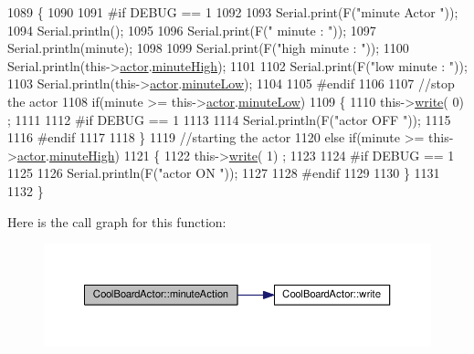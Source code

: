 \begin{DoxyCode}
1089 \{
1090 
1091 \textcolor{preprocessor}{#if DEBUG == 1}
1092     
1093     Serial.print(F(\textcolor{stringliteral}{"minute Actor "}));
1094     Serial.println();
1095 
1096     Serial.print(F(\textcolor{stringliteral}{" minute : "}));
1097     Serial.println(minute);
1098 
1099     Serial.print(F(\textcolor{stringliteral}{"high minute : "}));
1100     Serial.println(this->\hyperlink{class_cool_board_actor_a8f190db9f7a39fddbcef7f152da970e9}{actor}.\hyperlink{struct_cool_board_actor_1_1state_a4bff3d61ead74adb60be224764b93006}{minuteHigh});
1101 
1102     Serial.print(F(\textcolor{stringliteral}{"low minute : "}));
1103     Serial.println(this->\hyperlink{class_cool_board_actor_a8f190db9f7a39fddbcef7f152da970e9}{actor}.\hyperlink{struct_cool_board_actor_1_1state_acbcc2902331fd9d757cd475eb403bdd9}{minuteLow});
1104 
1105 \textcolor{preprocessor}{#endif}
1106 
1107     \textcolor{comment}{//stop the actor    }
1108     \textcolor{keywordflow}{if}(minute >= this->\hyperlink{class_cool_board_actor_a8f190db9f7a39fddbcef7f152da970e9}{actor}.\hyperlink{struct_cool_board_actor_1_1state_acbcc2902331fd9d757cd475eb403bdd9}{minuteLow})
1109     \{
1110         this->\hyperlink{class_cool_board_actor_a958786ff01ea1056ee72c72d439f86da}{write}( 0) ;
1111 
1112 \textcolor{preprocessor}{    #if DEBUG == 1 }
1113 
1114         Serial.println(F(\textcolor{stringliteral}{"actor OFF "}));
1115 
1116 \textcolor{preprocessor}{    #endif  }
1117 
1118     \}   
1119     \textcolor{comment}{//starting the actor}
1120     \textcolor{keywordflow}{else} \textcolor{keywordflow}{if}(minute >= this->\hyperlink{class_cool_board_actor_a8f190db9f7a39fddbcef7f152da970e9}{actor}.\hyperlink{struct_cool_board_actor_1_1state_a4bff3d61ead74adb60be224764b93006}{minuteHigh})
1121     \{
1122         this->\hyperlink{class_cool_board_actor_a958786ff01ea1056ee72c72d439f86da}{write}( 1) ;
1123 
1124 \textcolor{preprocessor}{    #if DEBUG == 1 }
1125 
1126         Serial.println(F(\textcolor{stringliteral}{"actor ON "}));
1127 
1128 \textcolor{preprocessor}{    #endif  }
1129 
1130     \}
1131 
1132 \} 
\end{DoxyCode}
Here is the call graph for this function\+:
\nopagebreak
\begin{figure}[H]
\begin{center}
\leavevmode
\includegraphics[width=350pt]{dc/d69/class_cool_board_actor_af000944ce0b9abb9c6ee4b8fe839fb36_cgraph}
\end{center}
\end{figure}
